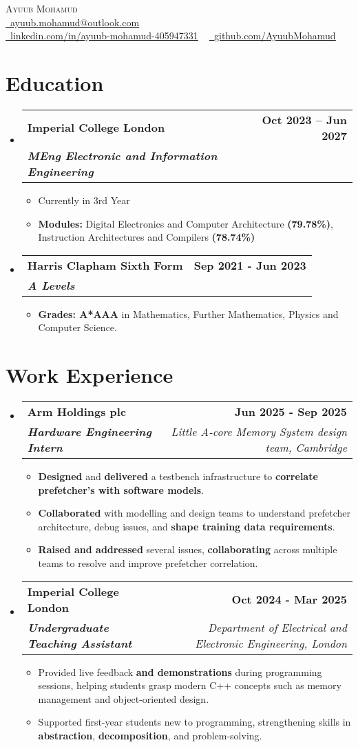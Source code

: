 \documentclass[a4paper,11pt]{article}
\makeatletter
\newcommand{\resumeItem}[1]{
  \item\small{
    {#1 \vspace{-2pt}}
  }
}
\newcommand{\resumeSubheading}[4]{
  \vspace{-2pt}\item
    \begin{tabular*}{1.0\textwidth}[t]{l@{\extracolsep{\fill}}r}
      \textbf{#1} & \textbf{\small #2} \\
      \textbf{\textit{\small #3}} & \textit{\small #4} \\
    \end{tabular*}\vspace{-9pt}
}
\newcommand{\resumeSubHeadingListStart}{\begin{itemize}[leftmargin=0.0in, label={}] \setlength{\itemsep}{-7pt}}
\newcommand{\resumeSubHeadingListEnd}{\end{itemize}}
\newcommand{\resumeSubHeadingWorkListStart}{\begin{itemize}[leftmargin=0.0in, label={}]}
\newcommand{\resumeSubHeadingWorkListEnd}{\end{itemize}}
\newcommand{\resumeItemListStart}{\begin{itemize}}
\newcommand{\resumeItemListEnd}{\end{itemize}\vspace{-8pt}}
\makeatother
\begin{document}
\begin{center}
    \vspace*{-0.3in}
    {\Huge \scshape Ayuub Mohamud} \\ \vspace{3pt}
    \href{mailto:ayuub.mohamud@outlook.com}{\raisebox{-0.2\height}\faEnvelope\  \underline{ayuub.mohamud@outlook.com}} \\
    \href{https://www.linkedin.com/in/ayuub-mohamud-405947331/}{\raisebox{-0.2\height}\faLinkedin\ \underline{linkedin.com/in/ayuub-mohamud-405947331}} ~
    \href{https://github.com/AyuubMohamud}{\raisebox{-0.2\height}\faGithub\ \underline{github.com/AyuubMohamud}}
    \vspace{-8pt}
\end{center}


\section{Education}
\resumeSubHeadingListStart
\resumeSubheading
{Imperial College London}{Oct 2023 -- Jun 2027}
{MEng Electronic and Information Engineering}{}
\resumeItemListStart
\resumeItem{Currently in 3rd Year}
\resumeItem{\textbf{Modules:} Digital Electronics and Computer Architecture \textbf{(79.78\%)}, Instruction Architectures and Compilers \textbf{(78.74\%)} }
\resumeItemListEnd
\vspace{4mm} %
\resumeSubheading
{Harris Clapham Sixth Form}{Sep 2021 - Jun 2023}
{A Levels}{}
\resumeItemListStart
\resumeItem{\textbf{Grades: A*AAA }in Mathematics, Further Mathematics, Physics and Computer Science.}
\resumeItemListEnd
\resumeSubHeadingListEnd
\section{Work Experience}
\resumeSubHeadingWorkListStart
\resumeSubheading
{Arm Holdings plc}{Jun 2025 - Sep 2025}
{Hardware Engineering Intern}{Little A-core Memory System design team, Cambridge}
\resumeItemListStart
\resumeItem{\textbf{Designed} and \textbf{delivered} a testbench infrastructure to \textbf{correlate prefetcher's with software models}.}
\resumeItem{\textbf{Collaborated} with modelling and design teams to understand prefetcher architecture, debug issues, and \textbf{shape training data requirements}.}
\resumeItem{\textbf{Raised and addressed} several issues, \textbf{collaborating} across multiple teams to resolve and improve prefetcher correlation.}
\resumeItemListEnd
\resumeSubheading
{Imperial College London}{Oct 2024 - Mar 2025}
{Undergraduate Teaching Assistant}{Department of Electrical and Electronic Engineering, London}
\resumeItemListStart
\resumeItem{Provided live feedback \textbf{and demonstrations} during programming sessions, helping students grasp modern C++ concepts such as memory management and object-oriented design.}
\resumeItem{Supported first-year students new to programming, strengthening skills in \textbf{abstraction}, \textbf{decomposition}, and problem-solving.}
\resumeItemListEnd
\resumeSubHeadingWorkListEnd
\end{document}
